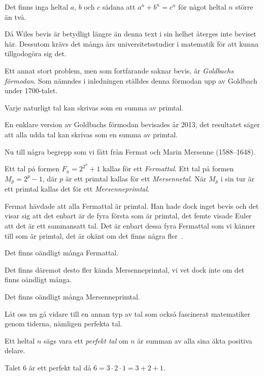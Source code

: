 \begin{theorem}
  Det finns inga heltal \(a\), \(b\) och \(c\) sådana att \(a^n + b^n = c^n\) 
  för något heltal \(n\) större än två.
\end{theorem}

Då Wiles bevis är betydligt längre än denna text i sin helhet återges inte 
beviset här.
Dessutom krävs det många års universitetsstudier i matematik för att kunna 
tillgodogöra sig det.

Ett annat stort problem, men som fortfarande saknar bevis, är \emph{Goldbachs 
förmodan}.
Som nämndes i inledningen ställdes denna förmodan upp av Goldbach under 
1700-talet.
\begin{conjecture}
  Varje naturligt tal kan skrivas som en summa av primtal.
\end{conjecture}
En enklare version av Goldbachs förmodan bevisades år 2013, det resultatet 
säger att alla udda tal kan skrivas som en summa av primtal.

Nu till några begrepp som vi fått från Fermat och Marin Mersenne (1588--1648).
\begin{definition}
  Ett tal på formen \(F_n = 2^{2^n} + 1\) kallas för ett \emph{Fermattal}.
  Ett tal på formen \(M_p = 2^p - 1\), där \(p\) är ett primtal kallas för ett 
  \emph{Mersennetal}.
  När \(M_p\) i sin tur är ett primtal kallas det för ett 
  \emph{Mersenneprimtal}.
\end{definition}
Fermat hävdade att alla Fermattal är primtal.
Han hade dock inget bevis och det visar sig att det enbart är de fyra första 
som är primtal, det femte visade Euler att det är ett sammansatt tal.
Det är enbart dessa fyra Fermattal som vi känner till som är primtal, det är 
okänt om det finns några fler~\cite{Laksov2005kou}.
\begin{conjecture}
  Det finns oändligt många Fermattal.
\end{conjecture}
Det finns däremot desto fler kända Mersenneprimtal, vi vet dock inte om det 
finns oändligt många.
\begin{conjecture}
  Det finns oändligt många Mersenneprimtal.
\end{conjecture}

Låt oss nu gå vidare till en annan typ av tal som också fascinerat matematiker 
genom tiderna, nämligen perfekta tal.
\begin{definition}
  Ett heltal \(n\) sägs vara ett \emph{perfekt tal} om \(n\) 
  är summan av alla sina äkta positiva delare.
\end{definition}
\begin{example}
  Talet \(6\) är ett perfekt tal då \(6 = 3\cdot 2\cdot 1 = 3 + 2 + 1\).
\end{example}

